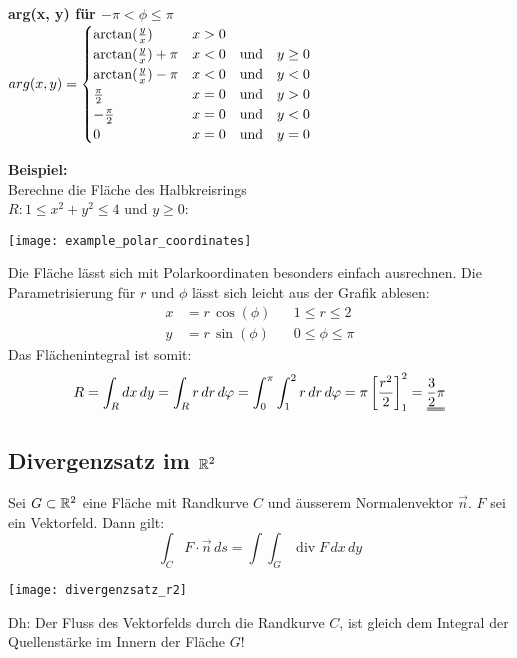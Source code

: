 \textbf{arg(x, y) für $-\pi < \phi \leq \pi$}\\
$arg(x, y) =
\begin{cases}
	\arctan(\frac{y}{x})				& x > 0 \\
	\arctan(\frac{y}{x}) + \pi			& x < 0 \hspace{10pt} \text{und} \hspace{10pt} y \geq 0 \\
	\arctan(\frac{y}{x}) - \pi			& x < 0 \hspace{10pt} \text{und} \hspace{10pt} y < 0 \\
	\frac{\pi}{2}						& x = 0 \hspace{10pt} \text{und} \hspace{10pt} y > 0\\
	-\frac{\pi}{2}						& x = 0 \hspace{10pt} \text{und} \hspace{10pt} y < 0\\
	0 									& x = 0 \hspace{10pt} \text{und} \hspace{10pt} y = 0
\end{cases}
$\\
\begin{minipage}{0.68\columnwidth}
	\textbf{Beispiel:}\\
	Berechne die Fläche des Halbkreisrings\\
	$R: 1 \leq x^2 + y^2 \leq 4$ und $y \geq 0$:
\end{minipage}
\begin{minipage}{0.31\columnwidth}
	\texttt{[image: example\_polar\_coordinates]}
\end{minipage}

Die Fläche lässt sich mit Polarkoordinaten besonders einfach ausrechnen. Die Parametrisierung für $r$ und $\phi$ lässt sich leicht aus der Grafik ablesen:
\begin{align*}
	x &= r \, \cos(\phi)	&& 1 \leq r \leq 2 \\
	y &= r \, \sin(\phi)	&& 0 \leq \phi \leq \pi
\end{align*}
Das Flächenintegral ist somit:
\begin{align*}
	R = \int_R dx \, dy = \int_R r \, dr \, d\phi = \int_0^{\pi} \int_1^2 r \, dr \, d\phi = \pi \left[\frac{r^2}{2}\right]_1^2 = \uuline{\frac{3}{2} \pi}
\end{align*}


\newpage
\subsection{Divergenzsatz im $\mathbb{R}^2$}
\begin{minipage}{0.68\columnwidth}
	Sei $G \subset \mathbb{R}^2$ eine Fläche mit Randkurve $C$ und äusserem Normalenvektor $\vec{n}$. $F$ sei ein Vektorfeld. Dann gilt:
	\[
		\int_{C} F \cdot \vec{n} \, ds = \int\int_G \operatorname{div} F \, dx \, dy
	\]
\end{minipage}
\begin{minipage}{0.31\columnwidth}
	\texttt{[image: divergenzsatz\_r2]}
\end{minipage}
Dh: Der Fluss des Vektorfelds durch die Randkurve $C$, ist gleich dem Integral der Quellenstärke im Innern der Fläche $G$!\\

